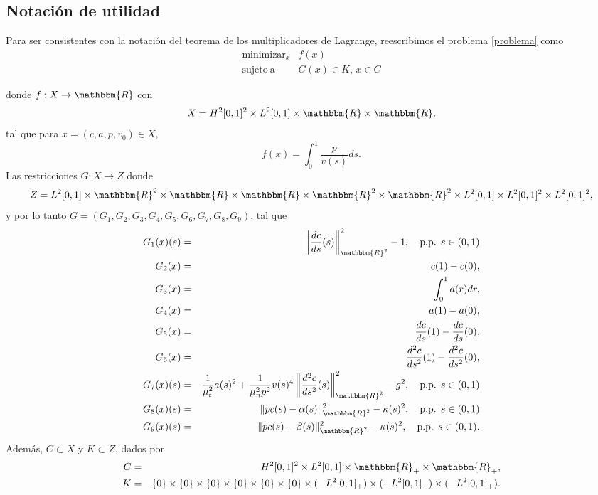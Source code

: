 \documentclass[a4paper,10pt]{book}
\newcommand{\R}{\mathbbm{R}}
\newcommand{\arr}{\rightarrow}
\begin{document}
\subsection{Notación de utilidad}

Para ser consistentes con la notación del teorema de los multiplicadores de Lagrange, reescribimos el problema \eqref{problema} como
\begin{equation}\label{pfinal}
\begin{array}{rl}
\displaystyle \mathop{\mathrm{minimizar}}_{x} & \displaystyle f(x) \\
\mathrm{sujeto \ a} & G(x)\in K,\, x\in C
\end{array}
\end{equation}

donde $f:X\arr \R$ con 
\[
 X=H^2[0,1]^2\times L^2[0,1]\times \R \times \R,
\]
tal que para $x=(c,a,p,v_0)\in X$,
$$
 f(x)=\int_{0}^{1} \frac{p}{v(s)}ds.
$$
Las restricciones $G:X\arr Z$ donde
\[
Z=L^2[0,1]\times \R^2\times \R\times \R\times \R^2\times \R^2\times L^2[0,1] \times L^2[0,1]^2 \times L^2[0,1]^2,
\]
y por lo tanto $G=(G_1,G_2,G_3,G_4,G_5,G_6,G_7,G_8,G_9)$, tal que
\begin{eqnarray*}
 G_1(x)(s)&=&\left\|\frac{dc}{ds}(s)\right\|_{\R^2}^2-1,\quad \mbox{p.p. }s\in(0,1)\\
 G_2(x)&=&c(1)-c(0),\\
 G_3(x)&=&\int_{0}^{1} a(r)dr,\\
 G_4(x)&=&a(1)-a(0),\\
 G_5(x)&=&\frac{dc}{ds}(1)-\frac{dc}{ds}(0),\\
 G_6(x)&=&\frac{d^2c}{ds^2}(1)-\frac{d^2c}{ds^2}(0),\\
 G_7(x)(s)&=&\frac{1}{\mu_t^2} a(s)^2 + \frac{1}{\mu_n^2 p^2}v(s)^4\left\| \frac{d^2 c}{ds^2}(s) \right\|_{\R^2}^2-g^2,\quad \mbox{p.p. }s\in(0,1)\\
 G_8(x)(s)&=&\|pc(s)-\alpha(s)\|_{\R^2}^2-\kappa(s)^2, \quad \mbox{p.p. }s\in(0,1)\\
 G_9(x)(s)&=&\|pc(s)-\beta(s)\|_{\R^2}^2-\kappa(s)^2, \quad \mbox{p.p. }s\in(0,1).\\
\end{eqnarray*}
Adem\'as, $C\subset X$ y $K\subset Z$, dados por
\begin{eqnarray*}
C&=&H^2[0,1]^2\times L^2[0,1]\times \R_+ \times \R_+,\\
K&=&\{0\}\times \{0\}\times \{0\}\times \{0\}\times \{0\}\times \{0\}\times (-L^2[0,1]_+) \times (-L^2[0,1]_+) \times (-L^2[0,1]_+).
\end{eqnarray*}
\end{document}
